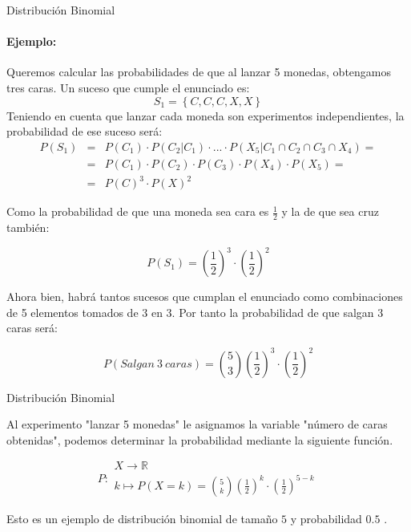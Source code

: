 \documentclass[11pt,handout]{beamer}
\begin{document}
\begin{frame}
{Distribución Binomial}
\paragraph{Ejemplo:} Queremos calcular las probabilidades de que al lanzar 5 monedas, obtengamos tres caras.
Un suceso que cumple el enunciado es:
$$S_1=\left\lbrace C,C,C,X,X \right\rbrace$$
Teniendo en cuenta que lanzar cada moneda son experimentos independientes, la probabilidad de ese suceso será:
\begin{eqnarray*}
P\left(S_1\right) & = &P\left(C_1\right)\cdot P\left(C_2 | C_1 \right)\cdot ... \cdot P\left(X_5 | C_1 \cap C_2  \cap C_3  \cap X_4   \right)= \\ &  = & P\left(C_1\right)\cdot  P\left(C_2\right) \cdot P\left(C_3\right) \cdot P\left(X_4\right) \cdot P\left(X_5\right)= \\
& = & P\left(C\right)^3\cdot  P\left(X\right)^2
\end{eqnarray*}

Como la probabilidad de que una moneda sea cara es $\frac{1}{2}$ y la de que sea cruz también:

$$P\left(S_1\right)=\left(\frac{1}{2}\right)^3\cdot  \left(\frac{1}{2}\right)^2$$

Ahora bien, habrá tantos sucesos que cumplan el enunciado como combinaciones de 5 elementos tomados de 3 en 3. Por tanto la probabilidad de que salgan 3 caras será:

$$P\left(Salgan \ 3 \ caras\right)=\binom{5}{3}\left(\frac{1}{2}\right)^3\cdot  \left(\frac{1}{2}\right)^2$$

\end{frame}

\begin{frame}{Distribución Binomial}

Al experimento "lanzar 5 monedas" le asignamos la variable "número de caras obtenidas", podemos determinar la probabilidad mediante la siguiente función.

$$P\colon \begin{array}{l} 
          X \rightarrow \mathbb{R} \\ 
          k\mapsto P(X=k)=\binom{5}{k}\left(\frac{1}{2}\right)^k\cdot  \left(\frac{1}{2}\right)^{5-k} 
         \end{array}$$

Esto es un ejemplo de distribución binomial de tamaño $5$ y probabilidad $0.5$ .
\end{frame}
\end{document}
